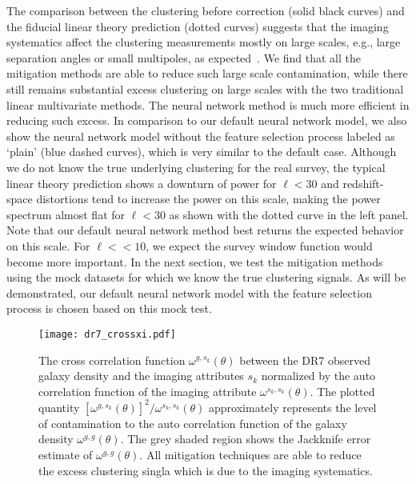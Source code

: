 \documentclass[fleqn, usenatbib]{mnras}
\begin{document}
The comparison between the clustering before correction (solid black curves) and the fiducial linear theory prediction (dotted curves) suggests that the imaging systematics affect the clustering measurements mostly on large scales, e.g., large separation angles or small multipoles, as expected~\citep[see e.g.,][]{myers2007clustering, ross2007higher, huterer2013calibration}. We find that all the mitigation methods are able to reduce such large scale contamination, while there still remains substantial excess clustering on large scales with the two traditional linear multivariate methods. The neural network method is much more efficient in reducing such excess. In comparison to our default neural network model, we also show the neural network model without the feature selection process labeled as `plain' (blue dashed curves), which is very similar to the default case. Although we do not know the true underlying clustering for the real survey, the typical linear theory prediction shows a downturn of power for $\ell<30$ and redshift-space distortions tend to increase the power on this scale, making the power spectrum almost flat for $\ell<30$ as shown with the dotted curve in the left panel. Note that our default neural network method best returns the expected behavior on this scale. For $\ell << 10$, we expect the survey window function would become more important. In the next section, we test the mitigation methods using the mock datasets for which we know the true clustering signals. As will be demonstrated, our default neural network model with the feature selection process is chosen based on this mock test. \\

\begin{figure*}
\centering
\texttt{[image: dr7\_crossxi.pdf]}
\caption{The cross correlation function $\omega^{g,s_k}(\theta)$ between the DR7 observed galaxy density and the imaging attributes $s_k$ normalized by the auto correlation function of the imaging attribute $\omega^{s_k,s_k}(\theta)$. The plotted quantity $[\omega^{g,s_k}(\theta)]^2/\omega^{s_k,s_k}(\theta)$ approximately represents the level of contamination to the auto correlation function of the galaxy density $\omega^{g,g}(\theta)$.  The grey shaded region shows the Jackknife error estimate of $\omega^{g,g}(\theta)$. All mitigation techniques are able to reduce the excess clustering singla which is due to the imaging systematics.  \label{fig:xicross}}
\end{figure*}
\end{document}
